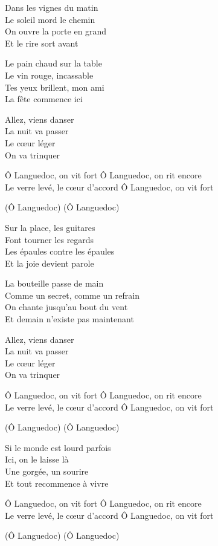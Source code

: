 \begin{lyrics}
Dans les vignes du matin\\
Le soleil mord le chemin\\
On ouvre la porte en grand\\
Et le rire sort avant

Le pain chaud sur la table\\
Le vin rouge, incassable\\
Tes yeux brillent, mon ami\\
La fête commence ici

Allez, viens danser\\
La nuit va passer\\
Le cœur léger\\
On va trinquer

Ô Languedoc, on vit fort
Ô Languedoc, on rit encore\\
Le verre levé, le cœur d’accord
Ô Languedoc, on vit fort

(Ô Languedoc)
(Ô Languedoc)

Sur la place, les guitares\\
Font tourner les regards\\
Les épaules contre les épaules\\
Et la joie devient parole

La bouteille passe de main\\
Comme un secret, comme un refrain\\
On chante jusqu’au bout du vent\\
Et demain n’existe pas maintenant

Allez, viens danser\\
La nuit va passer\\
Le cœur léger\\
On va trinquer

Ô Languedoc, on vit fort
Ô Languedoc, on rit encore\\
Le verre levé, le cœur d’accord
Ô Languedoc, on vit fort

(Ô Languedoc)
(Ô Languedoc)

Si le monde est lourd parfois\\
Ici, on le laisse là\\
Une gorgée, un sourire\\
Et tout recommence à vivre

Ô Languedoc, on vit fort
Ô Languedoc, on rit encore\\
Le verre levé, le cœur d’accord
Ô Languedoc, on vit fort

(Ô Languedoc)
(Ô Languedoc)
\end{lyrics}

